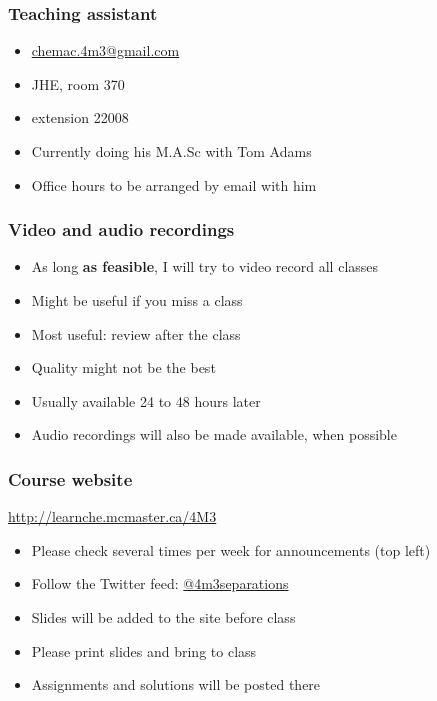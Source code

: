 \begin{frame}\frametitle{Teaching assistant}
	{\color{myGreen}{Dominik Seepersad}}
	\begin{itemize}
		\item	\url{chemac.4m3@gmail.com}
		\item	JHE, room 370
		\item	extension 22008
		\item	Currently doing his M.A.Sc with Tom Adams
		\item	Office hours to be arranged by email with him
	\end{itemize}
\end{frame}

\begin{frame}\frametitle{Video and audio recordings}
	\begin{itemize}
		\item	As long \textbf{as feasible}, I will try to video record all classes
		\item	Might be useful if you miss a class
		\item	Most useful: review after the class
		\item	Quality might not be the best   
		\item	Usually available 24 to 48 hours later
		\item	Audio recordings will also be made available, when possible
	\end{itemize}
\end{frame}

\begin{frame}\frametitle{Course website}
	
	\begin{exampleblock}{}
		\centering 
		\href{http://learnche.mcmaster.ca/4M3}{http://learnche.mcmaster.ca/4M3}
	\end{exampleblock}
	\begin{itemize}
		\item	Please check several times per week for announcements {\tiny (top left)}
		\item	Follow the Twitter feed: \href{https://twitter.com/4m3separations}{@4m3separations}
		\item	Slides will be added to the site before class
		\item	Please print slides and bring to class
		\item	Assignments and solutions will be posted there
	\end{itemize}
\end{frame}

